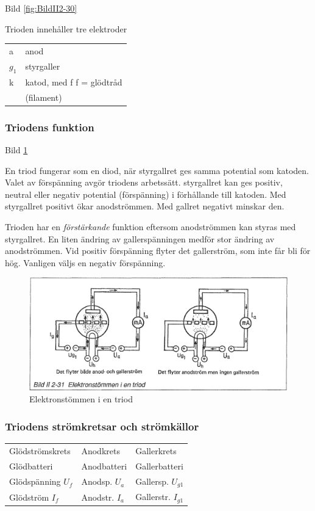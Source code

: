 Bild \ref{fig:BildII2-30}

Trioden innehåller tre elektroder
\begin{tabular}{ll}
a & anod \\
\(g_1\) & styrgaller \\
k & katod, med f f = glödtråd \\
  & (filament) \\
\end{tabular}

\subsubsection{Triodens funktion}

Bild \ref{fig:BildII2-31}

En triod fungerar som en diod, när styrgallret ges samma potential som katoden.
Valet av förspänning avgör triodens arbetssätt. styrgallret kan ges positiv,
neutral eller negativ potential (förspänning) i förhållande till katoden. Med
styrgallret positivt ökar anodströmmen. Med gallret negativt minskar den.

Trioden har en \emph{förstärkande} funktion eftersom anodströmmen kan styras med
styrgallret. En liten ändring av gallerspänningen medför stor ändring av
anodströmmen. Vid positiv förspänning flyter det gallerström, som inte får bli
för hög. Vanligen väljs en negativ förspänning.

\begin{figure}[h]
\includegraphics[width=\textwidth]{images/bild_2_2-31}
\caption{Elektronstömmen i en triod}
\label{fig:BildII2-31}
\end{figure}

\subsubsection{Triodens strömkretsar och strömkällor}

\begin{tabular}{lll}
Glödströmskrets      & Anodkrets        &  Gallerkrets \\
Glödbatteri          & Anodbatteri      &  Gallerbatteri \\
Glödspänning \(U_f\) & Anodsp. \(U_a\)  &  Gallersp. \(U_{g1}\) \\
Glödström \(I_f\)    & Anodstr. \(I_a\) &  Gallerstr. \(I_{g1}\) \\
\end{tabular}

